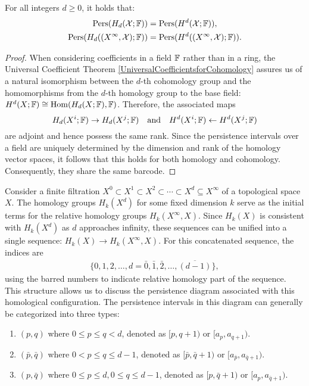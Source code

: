 \begin{theorem}{\cite[Proposition 2.3]{de2011dualities}}
For all integers $d \geq 0$, it holds that:
\begin{align}
\mathrm{Pers}(H_{d}(\mathcal{X};{\mathbb{F}})) &= \mathrm{Pers}(H^{d}(\mathcal{X};{\mathbb{F}})), \\
\mathrm{Pers}(H_{d}((X^{\infty}, \mathcal{X});{\mathbb{F}})) &= \mathrm{Pers}(H^{d}((X^{\infty}, \mathcal{X});{\mathbb{F}})).
\end{align}
\end{theorem}

\begin{proof}
When considering coefficients in a field ${\mathbb{F}}$ rather than in a ring, the Universal Coefficient Theorem \ref{UniversalCoefficientsforCohomology} assures us of a natural isomorphism between the $d$-th cohomology group and the homomorphisms from the $d$-th homology group to the base field: $H^{d}(X; {\mathbb{F}}) \cong \operatorname{Hom}(H_{d}(X; {\mathbb{F}}), {\mathbb{F}})$. Therefore, the associated maps
\begin{equation}
H_{d}(X^{i}; {\mathbb{F}}) \rightarrow H_{d}(X^{j}; {\mathbb{F}}) \quad \text{and} \quad H^{d}(X^{i}; {\mathbb{F}}) \leftarrow H^{d}(X^{j}; {\mathbb{F}})
\end{equation}
are adjoint and hence possess the same rank. Since the persistence intervals over a field are uniquely determined by the dimension and rank of the homology vector spaces, it follows that this holds for both homology and cohomology. Consequently, they share the same barcode.
\end{proof}

Consider a finite filtration $X^{0} \subset X^{1} \subset X^{2} \subset \cdots \subset X^d \subseteq X^{\infty}$ of a topological space $X$. The homology groups $H_{k}(X^{d})$ for some fixed dimension $k$ serve as the initial terms for the relative homology groups $H_{k}(X^{\infty}, X)$. Since $H_{k}(X)$ is consistent with $H_{k}(X^{d})$ as $d$ approaches infinity, these sequences can be unified into a single sequence: $H_{k}(X) \to H_{k}(X^{\infty}, X)$. For this concatenated sequence, the indices are 
\begin{align}
\{0, 1, 2, \ldots, d = \bar{0}, \bar{1}, \bar{2}, \ldots, \overline{(d-1)}\},
\end{align}
using the barred numbers to indicate relative homology part of the sequence. This structure allows us to discuss the persistence diagram associated with this homological configuration. The persistence intervals in this diagram can generally be categorized into three types:
\begin{enumerate}
	\item $(p, q)$ where $0 \leq p \leq q < d$, denoted as $[p, q+1)$ or $[a_{p}, a_{q+1})$.
	\item $(\bar{p}, \bar{q})$ where $0 < p \leq q \leq d-1$, denoted as $[\bar{p}, \bar{q}+1)$ or $[a_{\bar{p}}, a_{\bar{q}+1})$.
	\item $(p, \bar{q})$ where $0 \leq p \leq d, 0 \leq q \leq d-1$, denoted as $[p, \bar{q}+1)$ or $[a_{p}, a_{\bar{q}+1})$.
\end{enumerate}

